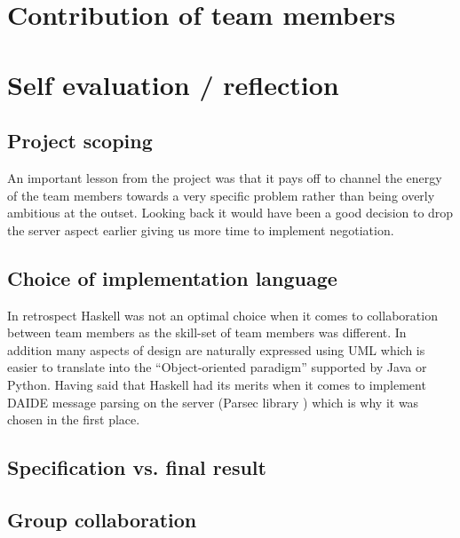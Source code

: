 \documentclass[pdftex,12pt,a4paper]{report}
\begin{document}

\pagebreak

\section{Contribution of team members}


\pagebreak

\section{Self evaluation / reflection}

\subsection{Project scoping}

An important lesson from the project was that it pays off to channel
the energy of the team members towards a very specific problem rather
than being overly ambitious at the outset. Looking back it would have
been a good decision to drop the server aspect earlier giving us more
time to implement negotiation.

\subsection{Choice of implementation language}

In retrospect Haskell was not an optimal choice when it comes to
collaboration between team members as the skill-set of team members
was different. In addition many aspects of design are naturally
expressed using UML which is easier to translate into the
``Object-oriented paradigm'' supported by Java or Python.  Having said
that Haskell had its merits when it comes to implement DAIDE message
parsing on the server (Parsec library \cite{ParsecLib}) which is why
it was chosen in the first place.


\subsection{Specification vs. final result}

\subsection{Group collaboration}
\end{document}

